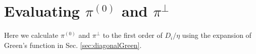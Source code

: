 %
%
%
%
%
%
%
%
%




\section{Evaluating $\pi^{(0)}$ and $\pi^{\perp}$\label{sec:calculatePi}}
Here we  calculate $\pi^{(0)}$ and $\pi^{\perp}$ to the first order of $D_i/\eta$ using the expansion of Green's function in Sec. \ref{sec:diagonalGreen}.

